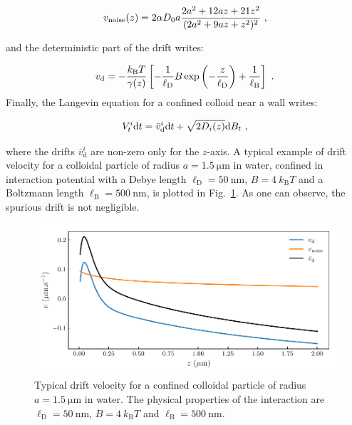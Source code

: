 \begin{equation}
	v_\textnormal{noise} (z)= 2 \alpha D_0 a\frac{2a^2 + 12 az + 21 z^2}{(2 a^2 + 9az + z^2) ^2} ~,
	\label{Eq.spurious_drift}
\end{equation}

and the deterministic part of the drift writes:

\begin{equation}
	v_\textnormal{d} =- \frac{k_\mathrm{B}T}{\gamma(z)} \left[- \frac{1}{\ell_\mathrm{D}} B \exp \left(- \frac{z}{\ell_\mathrm{D}}\right) + \frac{1}{\ell_\mathrm{B}}\right] ~.
\end{equation}
Finally, the Langevin equation for a confined colloid near a wall writes:

\begin{equation}
	V_t^i \textnormal{d}t  = \bar{v}_\mathrm{d} ^i \textnormal{d}t + \sqrt{2D_i (z)}  \textnormal{d}B_t ~,
	\label{Eq.langevin_confined}
\end{equation}

where the drifts $\bar{v}_\mathrm{d} ^i $ are non-zero only for the $z$-axis. A typical example of drift velocity for a colloidal particle of radius $a = 1.5 ~\mathrm{\mu m}$ in water, confined in interaction potential with a Debye length $\ell_\mathrm{D} = 50 ~ \mathrm{nm}$, $B = 4 ~k_\mathrm{B}T$ and a Boltzmann length $\ell_\mathrm{B} = 500 ~ \mathrm{nm}$, is plotted in Fig.~\ref{fig.spurious}. As one can observe, the spurious drift is not negligible.
\begin{figure}[ht]
	\centering
	\includegraphics{02_body/chapter3/images/spurious_drift/spurious.pdf}
	\caption{Typical drift velocity for a confined colloidal particle of radius $a = 1.5 ~\mathrm{\mu m}$ in water. The physical properties of the interaction are $\ell_\mathrm{D} = 50 ~ \mathrm{nm}$, $B = 4 ~k_\mathrm{B}T$ and $\ell_\mathrm{B} = 500 ~ \mathrm{nm}$.} 
	\label{fig.spurious}
\end{figure}

